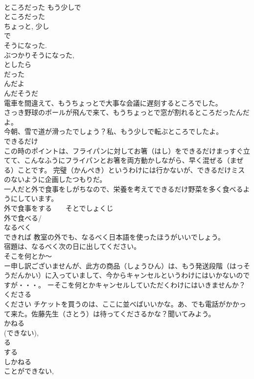 \documentclass[8pt]{extreport}
\begin{document}
\begin{CJK}{UTF8}{min}
\\	ところだった もう少しで
\\	ところだった	
\\	ちょっと, 少し 
\\	で 
\\	そうになった. 
\\	ぶつかりそうになった, 
\\	としたら 
\\	だった 
\\	んだよ 
\\	んだそうだ 
\\	電車を間違えて、もうちょっとで大事な会議に遅刻するところでした。 
\\	さっき野球のボールが飛んで来て、もうちょっとで窓が割れるところだったんだよ。 
\\	今朝、雪で道が滑ったでしょう？私、もう少しで転ぶところでしたよ。 
\\	できるだけ	
\\	この時のポイントは、フライパンに対してお箸（はし）をできるだけまっすぐ立てて、こんなふうにフライパンとお箸を両方動かしながら、早く混ぜる（まぜる）ことです。 完璧（かんぺき）というわけには行かないが、できるだけミスのないように企画したつもりだ。 
\\	一人だと外で食事をしがちなので、栄養を考えてできるだけ野菜を多く食べるようにしています。 
\\	外で食事をする　　そとでしょくじ 
\\	外で食べる/
\\	なるべく 
\\	できれば 教室の外でも、なるべく日本語を使ったほうがいいでしょう。 
\\	宿題は、なるべく次の日に出してください。 
\\	そこを何とか～	
\\	ー申し訳ございませんが、此方の商品（しょうひん）は、もう発送段階（はっそうだんかい）に入っていまして、今からキャンセルというわけにはいかないのですが・・・。 ーそこを何とかキャンセルしていただくわけにはいきませんか？ 
\\	くださる	
\\	ください チケットを買うのは、ここに並べばいいかな。あ、でも電話がかかって来た。佐藤先生（さとう）は待ってくださるかな？聞いてみよう。 
\\	かねる	
\\	(できない), 
\\	る 
\\	する 
\\	しかねる 
\\	ことができない, 

\end{CJK}
\end{document}
